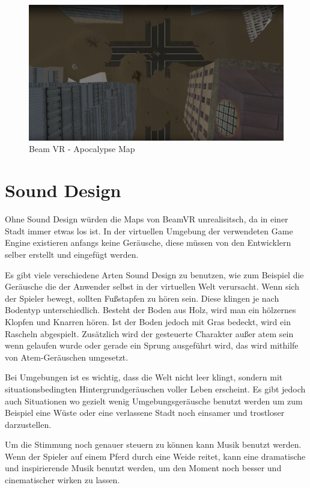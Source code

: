 \begin {figure}
    \centering
    \includegraphics[scale=0.3]{pics/beamvr_apocalypse-overview}
    \caption{Beam VR - Apocalypse Map}
    \label{fig:beamvr_apocalypse_map}
\end {figure}



\section{Sound Design}\label{sec:sound}
Ohne Sound Design würden die Maps von BeamVR unrealisitsch, da in einer Stadt immer etwas los ist.
In der virtuellen Umgebung der verwendeten Game Engine existieren anfangs keine Geräusche, diese m\"ussen von den Entwicklern selber erstellt und eingef\"ugt werden.


Es gibt viele verschiedene Arten Sound Design zu benutzen, wie zum Beispiel die Ger\"ausche die der Anwender selbst in der virtuellen Welt verursacht.
Wenn sich der Spieler bewegt, sollten Fußstapfen zu h\"oren sein.
Diese klingen je nach Bodentyp unterschiedlich.
Besteht der Boden aus Holz, wird man ein h\"olzernes Klopfen und Knarren h\"oren.
Ist der Boden jedoch mit Gras bedeckt, wird ein Rascheln abgespielt.
Zus\"atzlich wird der gesteuerte Charakter außer atem sein wenn gelaufen wurde oder gerade ein Sprung ausgef\"uhrt wird, das wird mithilfe von Atem-Geräuschen umgesetzt.

Bei Umgebungen ist es wichtig, dass die Welt nicht leer klingt, sondern mit situationsbedingten Hintergrundger\"auschen voller Leben erscheint.
Es gibt jedoch auch Situationen wo gezielt wenig Umgebungsger\"ausche benutzt werden um zum Beispiel eine W\"uste oder eine verlassene Stadt noch einsamer und trostloser darzustellen.

Um die Stimmung noch genauer steuern zu k\"onnen kann Musik benutzt werden.
Wenn der Spieler auf einem Pferd durch eine Weide reitet, kann eine dramatische und inspirierende Musik benutzt werden, um den Moment noch besser und cinematischer wirken zu lassen.

